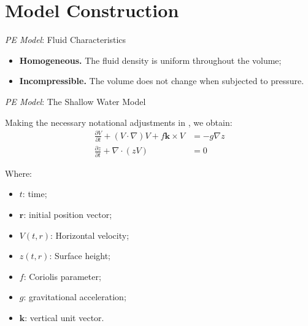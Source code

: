 \section{Model Construction} 


\begin{frame}{\textit{PE Model}: Fluid Characteristics}
	\begin{itemize}
		\item \textbf{Homogeneous.} The fluid density is uniform throughout the volume;
		\item \textbf{Incompressible.} The volume does not change when subjected to pressure.
	\end{itemize}
\end{frame}


\begin{frame}{\textit{PE Model}: The Shallow Water Model}
			
	Making the necessary notational adjustments in \cite{salmon1998}, we obtain:
	\begin{align}
		\frac{\partial V}{\partial t} + (V \cdot \nabla)V + f \mathbf{k} \times V & = -g \nabla z \label{eq:shallow-water-1} \\
		\frac{\partial z}{\partial t} + \nabla \cdot (z V)                        & = 0 \label{eq:shallow-water-2}           
	\end{align}
			
	\begin{small}
		Where:
		\begin{multicols}{2}
			\begin{itemize}
				\item $t$: time;
				\item $\mathbf{r}$: initial position vector;
				\item $V(t,r)$: Horizontal velocity;
				\item $z(t,r)$: Surface height;
				\item $f$: Coriolis parameter;
				\item $g$: gravitational acceleration;
				\item $\mathbf{k}$: vertical unit vector.
			\end{itemize}
		\end{multicols}
	\end{small}
\end{frame}


